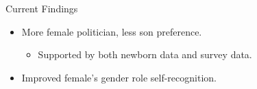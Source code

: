 \documentclass[
  10pt,
  ignorenonframetext,
  aspectratio=43,
]{beamer}
\providecommand{\tightlist}{%
  \setlength{\itemsep}{0pt}\setlength{\parskip}{0pt}}
\begin{document}
\begin{frame}{Current Findings}
\protect\hypertarget{current-findings}{}
\begin{itemize}
\tightlist
\item
  More female politician, less son preference.

  \begin{itemize}
  \tightlist
  \item
    Supported by both newborn data and survey data.
  \end{itemize}
\item
  Improved female's gender role self-recognition.
\end{itemize}
\end{frame}
\end{document}
